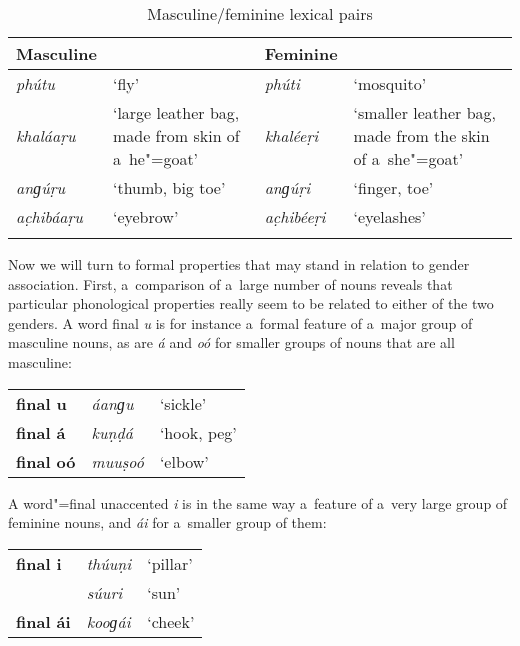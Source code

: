\begin{table}[ht]
\caption{Masculine/feminine lexical pairs}
\begin{tabularx}{\textwidth}{ l Q l Q }
\lsptoprule
Masculine &
&
Feminine &
\\\hline
\textit{phútu} &
`fly' &
\textit{phúti} &
`mosquito'\\
\textit{khaláaṛu}
&
`large leather bag, made from skin of a~he"=goat' &
\textit{khaléeṛi}
&
`smaller leather bag, made from the skin of a~she"=goat'\\
\textit{anɡúṛu} &
`thumb, big toe' &
\textit{anɡúṛi} &
`finger, toe'\\
\textit{ac̣hibáaṛu} &
`eyebrow' &
\textit{ac̣hibéeṛi} &
`eyelashes'\\\lspbottomrule
\end{tabularx}
\label{tab:4-2}
\end{table}

Now we will turn to formal properties that may stand in relation to gender association. First, a~comparison of a~large number of nouns reveals that particular phonological properties really seem to be related to either of the two genders. A word final \textit{u} is for instance a~formal feature of a~major group of masculine nouns, as are \textit{á} and \textit{oó} for smaller groups of nouns that are all masculine:



\begin{table}[H]
\begin{tabularx}{\textwidth}{ l l l }
\textbf{final u} &
\textit{áanɡu} &
`sickle'\\
\textbf{final á} &
\textit{kuṇḍá} &
`hook, peg'\\
\textbf{final oó} &
\textit{muuṣoó} &
`elbow'\\
\end{tabularx}
\end{table}

A word"=final unaccented \textit{i} is in the same way a~feature of a~very large group of feminine nouns, and \textit{ái} for a~smaller group of them:


\begin{table}[H]
\begin{tabularx}{\textwidth}{ l l l }
\textbf{final i} &
\textit{thúuṇi} &
`pillar'\\
&
\textit{súuri} &
`sun'\\
\textbf{final ái} &
\textit{kooɡái} &
`cheek'\\
\end{tabularx}
\end{table}

